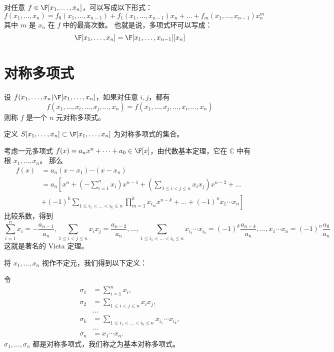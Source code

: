 对任意 \( f \in \F[x_1,\dots,x_n] \)，可以写成以下形式：
\[
f(x_1,\dots,x_n) = f_0(x_1,\dots,x_{n-1}) + f_1(x_1,\dots,x_{n-1})x_n + \dots + f_m(x_1,\dots,x_{n-1})x_n^m
\]
其中 \( m \) 是 \( x_n \) 在 \( f \) 中的最高次数。
也就是说，多项式环可以写成：
\[
\F[x_1,\dots,x_n] = \F[x_1,\dots,x_{n-1}][x_n]
\]
\section{对称多项式}
\begin{definition}\label{p1:concept:c1-l1460}
	设 \( f(x_1,\dots,x_n) \F[x_1,\dots,x_n] \)，如果对任意 \( i,j \)，都有
	\[
	f(x_1,\dots,x_i,\dots,x_j,\dots,x_n) = f(x_1,\dots,x_j,\dots,x_i,\dots,x_n)
	\]
	则称 \( f \) 是一个 \( n \) 元对称多项式。
	
	定义 \( S[x_1,\dots,x_n] \subset \F[x_1,\dots,x_n] \) 为对称多项式的集合。
\end{definition}


考虑一元多项式 \( f(x)=a_nx^n+\dots+a_0 \in \F[x] \)，由代数基本定理，它在 \( \mathbb{C} \) 中有根 \( x_1,\dots,x_n \)。
那么
\[
\begin{aligned}
	f(x) &= a_n(x-x_1)\cdots(x-x_n) \\
	&= a_n\left[ x^n + \left(-\sum_{i=1}^n x_i\right)x^{n-1} + \left(\sum_{1\le i<j\le n} x_i x_j\right)x^{n-2} + \dots \right. \\
	& \left. + (-1)^k \sum_{1\le i_1<\dots<i_k\le n} \prod_{m=1}^k x_{i_m} x^{n-k} + \dots + (-1)^n x_1\cdots x_n \right]
\end{aligned}
\]
比较系数，得到
\[
\sum_{i=1}^n x_i = -\frac{a_{n-1}}{a_n}
,\sum_{1\le i<j\le n} x_i x_j = \frac{a_{n-2}}{a_n},
\dots,
\sum_{1\le i_1<\dots<i_k\le n} x_{i_1}\cdots x_{i_k} = (-1)^k\frac{a_{n-k}}{a_n},
\dots,
x_1\cdots x_n = (-1)^n\frac{a_0}{a_n}
\]
这就是著名的 Vieta 定理。

将 \( x_1,\dots,x_n \) 视作不定元，我们得到以下定义：

\begin{definition}\label{p1:concept:c1-l1493}
	令
	\[
	\begin{aligned}
		\sigma_1 &= \sum_{i=1}^n x_i, \\
		\sigma_2 &= \sum_{1\le i<j\le n} x_i x_j, \\
		&\dots \\
		\sigma_k &= \sum_{1\le i_1<\dots<i_k\le n} x_{i_1}\cdots x_{i_k}, \\
		&\dots \\
		\sigma_n &= x_1\cdots x_n.
	\end{aligned}
	\]
	\( \sigma_1,\dots,\sigma_n \) 都是对称多项式，我们称之为基本对称多项式。
\end{definition}

